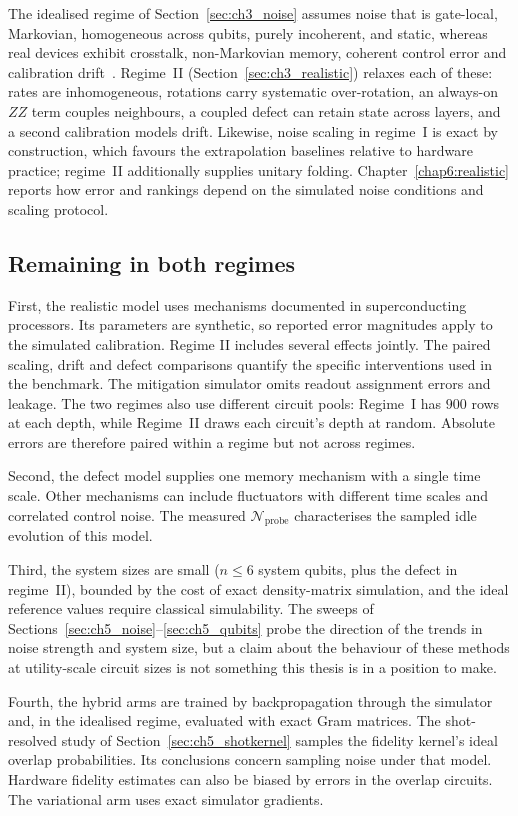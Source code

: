 \documentclass[Thesis.tex]{subfiles}
\begin{document}
The idealised regime of Section~\ref{sec:ch3_noise} assumes noise that is
gate-local, Markovian, homogeneous across qubits, purely incoherent, and static,
whereas real devices exhibit crosstalk, non-Markovian memory, coherent control error
and calibration drift~\cite{harper2020efficient,nielsen2021gst}. Regime~II
(Section~\ref{sec:ch3_realistic}) relaxes each of these: rates are inhomogeneous,
rotations carry systematic over-rotation, an always-on $ZZ$ term couples neighbours,
a coupled defect can retain state across layers, and a second calibration
models drift.
Likewise, noise scaling in regime~I is exact by construction, which favours the
extrapolation baselines relative to hardware practice; regime~II additionally
supplies unitary folding. Chapter~\ref{chap6:realistic} reports how error and
rankings depend on the simulated noise conditions and scaling protocol.

\subsection{Remaining in both regimes}

First, the realistic model uses mechanisms documented in superconducting processors.
Its parameters are synthetic, so reported error magnitudes apply to the
simulated calibration. Regime II includes several effects jointly.
The paired scaling, drift and defect comparisons quantify the specific
interventions used in the benchmark. The mitigation simulator omits readout
assignment errors and leakage. The two regimes also use different circuit pools:
Regime~I has $900$ rows at each depth, while Regime~II draws each circuit's depth at
random. Absolute errors are therefore paired within a regime but not across regimes.

Second, the defect model supplies one memory mechanism with a single time scale.
Other mechanisms can include fluctuators with different time scales and
correlated control noise. The measured $\mathcal{N}_{\mathrm{probe}}$
characterises the sampled idle evolution of this model.

Third, the system sizes are small ($n \leq 6$ system qubits, plus the defect in
regime~II), bounded by the cost of exact density-matrix simulation, and the ideal
reference values require classical simulability. The sweeps of
Sections~\ref{sec:ch5_noise}--\ref{sec:ch5_qubits} probe the direction of the trends
in noise strength and system size, but a claim about the behaviour of these methods
at utility-scale circuit sizes is not something this thesis is in a position to
make.

Fourth, the hybrid arms are trained by backpropagation through the simulator and, in
the idealised regime, evaluated with exact Gram matrices. The shot-resolved study of
Section~\ref{sec:ch5_shotkernel} samples the fidelity kernel's ideal
overlap probabilities. Its conclusions concern sampling noise under that
model. Hardware fidelity estimates can also be biased by errors in the
overlap circuits. The variational arm uses exact simulator gradients.
\end{document}
